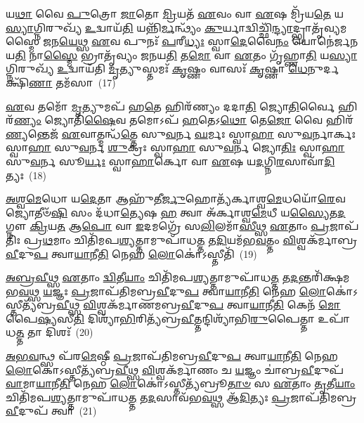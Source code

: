 {\anuvakamend[{\-\ul{𑌭𑌾}\-\-\ul{𑌗}\-𑌧𑍇\-\ul{𑌯}\-𑌞𑍍𑌜𑍁𑌹𑍍𑌵᳴𑌤𑌿 𑌪\-\ul{𑌰}\-𑌮𑌾 \ul{𑌰𑌾}\-𑌷𑍍𑌟𑍍𑌰𑌂 𑌦᳴𑌧𑌾𑌤𑌿 \ul{𑌸}\-𑌪𑍍𑌤 𑌚᳴}]}%

𑌯\-\ul{𑌥𑌾} 𑌵𑍈 \ul{𑌪𑍁}\-𑌤𑍍𑌰𑍋 \ul{𑌜𑌾}\-𑌤𑍋 \ul{𑌮𑍍𑌰𑌿}\-𑌯𑌤᳴ \ul{𑌏}\-𑌵𑌂 𑌵𑌾 \ul{𑌏}\-𑌷 𑌮𑍍𑌰𑌿᳴𑌯\-\ul{𑌤𑍇} 𑌯\-\ul{𑌸𑍍𑌯𑌾}\-𑌗𑍍𑌨𑌿𑌰𑍁𑌖𑍍𑌯᳴ \ul{𑌉}\-𑌦𑍍𑌵𑌾𑌯᳴\-\ul{𑌤𑌿} 𑌯𑌨𑍍𑌨𑌿᳴\-\ul{𑌰𑍍𑌮}\-𑌨𑍍𑌥𑍍𑌯𑌂᳴ \ul{𑌕𑍁}\-𑌰𑍍𑌯𑌾𑌦𑍍𑌵𑌿𑌚𑍍𑌛𑌿᳴\-\ul{𑌨𑍍𑌦𑍍𑌯𑌾}\-𑌦𑍍𑌭𑍍𑌰𑌾𑌤𑍃᳴𑌵𑍍𑌯𑌮𑌸𑍍𑌮𑍈 𑌜𑌨\-\ul{𑌯𑍇}\-𑌥𑍍𑌸 \ul{𑌏}\-𑌵 𑌪𑍁𑌨𑌃᳴ \ul{𑌪}\-𑌰𑍀\-\ul{𑌧𑍍𑌯𑌃} 𑌸𑍍𑌵𑌾\-\ul{𑌦𑍇}\-𑌵𑍈\-\ul{𑌨𑌂} 𑌯𑍋𑌨𑍇॑𑌰𑍍𑌜𑌨𑌯\-\ul{𑌤𑌿} 𑌨𑌾\-\ul{𑌸𑍍𑌮𑍈} 𑌭𑍍𑌰𑌾𑌤𑍃᳴𑌵𑍍𑌯𑌂 𑌜𑌨𑌯\-\ul{𑌤𑌿} 𑌤\-\ul{𑌮𑍋} 𑌵𑌾 \ul{𑌏}\-𑌤𑌂 𑌗𑍃᳴𑌹𑍍𑌣𑌾\-\ul{𑌤𑌿} 𑌯\-\ul{𑌸𑍍𑌯𑌾}\-𑌗𑍍𑌨𑌿𑌰𑍁𑌖𑍍𑌯᳴ \ul{𑌉}\-𑌦𑍍𑌵𑌾𑌯᳴𑌤𑌿 \ul{𑌮𑍃}\-𑌤𑍍𑌯𑍁𑌸𑍍𑌤𑌮𑌃᳴ \ul{𑌕𑍃}\-𑌷𑍍𑌣𑌂 𑌵𑌾𑌸𑌃᳴ \ul{𑌕𑍃}\-𑌷𑍍𑌣𑌾 \ul{𑌧𑍇}\-𑌨𑍁𑌰𑍍𑌦𑌕𑍍𑌷𑌿᳴\-\ul{𑌣𑌾} 𑌤𑌮᳴𑌸𑌾~(17)

\-\ul{𑌏}\-𑌵 𑌤𑌮𑍋᳴ \ul{𑌮𑍃}\-𑌤𑍍𑌯𑍁𑌮𑌪᳴ 𑌹\-\ul{𑌤𑍇} 𑌹𑌿𑌰᳴𑌣𑍍𑌯𑌂 𑌦𑌦𑌾\-\ul{𑌤𑌿} 𑌜𑍍𑌯𑍋\-\ul{𑌤𑌿}\-𑌰𑍍𑌵𑍈 𑌹𑌿𑌰᳴\-\ul{𑌣𑍍𑌯𑌂} 𑌜𑍍𑌯𑍋𑌤𑌿᳴\-\ul{𑌷𑍈}\-𑌵 𑌤𑌮𑍋\-𑌽𑌪᳴ \ul{𑌹}\-𑌤𑍇\-𑌽\-\ul{𑌥𑍋} 𑌤𑍇\-\ul{𑌜𑍋} 𑌵𑍈 𑌹𑌿𑌰᳴\-\ul{𑌣𑍍𑌯}\-𑌨𑍍𑌤𑍇𑌜᳴ \ul{𑌏}\-𑌵𑌾𑌤𑍍𑌮𑌨𑍍𑌧᳴\-\ul{𑌤𑍍𑌤𑍇} 𑌸𑍁\-\ul{𑌵}\-𑌰𑍍𑌨 \ul{𑌘}\-𑌰𑍍𑌮𑌃 𑌸𑍍𑌵𑌾\-\ul{𑌹𑌾} 𑌸𑍁\-\ul{𑌵}\-𑌰𑍍𑌨𑌾𑌰𑍍𑌕𑌃 𑌸𑍍𑌵𑌾\-\ul{𑌹𑌾} 𑌸𑍁\-\ul{𑌵}\-𑌰𑍍𑌨 \ul{𑌶𑍁}\-𑌕𑍍𑌰𑌃 𑌸𑍍𑌵𑌾\-\ul{𑌹𑌾} 𑌸𑍁\-\ul{𑌵}\-𑌰𑍍𑌨 𑌜𑍍𑌯𑍋\-\ul{𑌤𑌿𑌃} 𑌸𑍍𑌵𑌾\-\ul{𑌹𑌾} 𑌸𑍁\-\ul{𑌵}\-𑌰𑍍𑌨 𑌸𑍂\-\ul{𑌰𑍍𑌯𑌃} 𑌸𑍍𑌵𑌾\-\ul{𑌹𑌾}\-𑌰𑍍𑌕𑍋 𑌵𑌾 \ul{𑌏}\-𑌷 𑌯\-\ul{𑌦}\-𑌗𑍍𑌨𑌿\-\ul{𑌰}\-𑌸𑌾𑌵𑌾᳴\-\ul{𑌦𑌿}\-𑌤𑍍𑌯𑌃~(18)

\-\ul{𑌅}\-\-\ul{𑌶𑍍𑌵}\-\-\ul{𑌮𑍇}\-𑌧𑍋 𑌯\-\ul{𑌦𑍇}\-𑌤𑌾 𑌆𑌹𑍁᳴𑌤𑍀\-\ul{𑌰𑍍𑌜𑍁}\-𑌹𑍋𑌤𑍍𑌯᳴𑌰𑍍𑌕𑌾𑌶𑍍𑌵\-\ul{𑌮𑍇}\-𑌧𑌯𑍋᳴\-\ul{𑌰𑍇}\-𑌵 𑌜𑍍𑌯𑍋𑌤𑍀𑍞᳴\-\ul{𑌷𑌿} 𑌸𑌂 𑌦᳴𑌧𑌾\-\ul{𑌤𑍍𑌯𑍇}\-𑌷 \ul{𑌹} 𑌤𑍍𑌵𑌾 𑌅᳴𑌰𑍍𑌕𑌾𑌶𑍍𑌵\-\ul{𑌮𑍇}\-𑌧𑍀 𑌯\-\ul{𑌸𑍍𑌯𑍈}\-𑌤\-\ul{𑌦}\-𑌗𑍍𑌨𑍗 \ul{𑌕𑍍𑌰𑌿}\-𑌯\-\ul{𑌤} 𑌆\-\ul{𑌪𑍋} 𑌵𑌾 \ul{𑌇}\-𑌦𑌮𑌗𑍍𑌰𑍇᳴ 𑌸\-\ul{𑌲𑌿}\-𑌲𑌮𑌾᳴\-\ul{𑌸𑍀}\-𑌥𑍍𑌸 \ul{𑌏}\-𑌤𑌾𑌂 \ul{𑌪𑍍𑌰}\-𑌜𑌾𑌪᳴𑌤𑌿𑌃 𑌪𑍍𑌰\-\ul{𑌥}\-𑌮𑌾𑌂 𑌚𑌿𑌤𑌿᳴𑌮𑌪\-\ul{𑌶𑍍𑌯}\-𑌤𑍍𑌤𑌾𑌮𑍁𑌪𑌾᳴𑌧\-\ul{𑌤𑍍𑌤} 𑌤\-\ul{𑌦𑌿}\-𑌯𑌮᳴𑌭\-\ul{𑌵}\-𑌤𑍍𑌤𑌂 \ul{𑌵𑌿}\-𑌶𑍍𑌵𑌕᳴𑌰𑍍𑌮𑌾𑌬𑍍𑌰\-\ul{𑌵𑍀}\-𑌦𑍁\-\ul{𑌪} 𑌤𑍍𑌵𑌾\-\ul{𑌯𑌾}\-𑌨𑍀\-\ul{𑌤𑌿} 𑌨𑍇𑌹 \ul{𑌲𑍋}\-𑌕𑍋॑\-𑌽𑌸𑍍𑌤𑍀𑌤𑌿᳴~(19)

\-\ul{𑌅}\-\-\ul{𑌬𑍍𑌰}\-\-\ul{𑌵𑍀}\-𑌥𑍍𑌸 \ul{𑌏}\-𑌤𑌾𑌂 \ul{𑌦𑍍𑌵𑌿}\-𑌤𑍀\-\ul{𑌯𑌾𑌂} 𑌚𑌿𑌤𑌿᳴𑌮𑌪\-\ul{𑌶𑍍𑌯}\-𑌤𑍍𑌤𑌾𑌮𑍁𑌪𑌾᳴𑌧\-\ul{𑌤𑍍𑌤} 𑌤\-\ul{𑌦}\-𑌨𑍍𑌤𑌰𑌿᳴𑌕𑍍𑌷𑌮𑌭\-\ul{𑌵}\-𑌥𑍍𑌸 \ul{𑌯}\-𑌜𑍍𑌞𑌃 \ul{𑌪𑍍𑌰}\-𑌜𑌾𑌪᳴𑌤𑌿𑌮𑌬𑍍𑌰\-\ul{𑌵𑍀}\-𑌦𑍁\-\ul{𑌪} 𑌤𑍍𑌵𑌾\-\ul{𑌯𑌾}\-𑌨𑍀\-\ul{𑌤𑌿} 𑌨𑍇𑌹 \ul{𑌲𑍋}\-𑌕𑍋॑\-𑌽𑌸𑍍𑌤𑍀𑌤𑍍𑌯᳴𑌬𑍍𑌰\-\ul{𑌵𑍀}\-𑌥𑍍𑌸 \ul{𑌵𑌿}\-𑌶𑍍𑌵𑌕᳴𑌰𑍍𑌮𑌾𑌣𑌮𑌬𑍍𑌰\-\ul{𑌵𑍀}\-𑌦𑍁\-\ul{𑌪} 𑌤𑍍𑌵𑌾\-\ul{𑌯𑌾}\-𑌨𑍀\-\ul{𑌤𑌿} 𑌕𑍇𑌨᳴ \ul{𑌮𑍋}\-𑌪𑍈\-\ul{𑌷𑍍𑌯}\-𑌸𑍀\-\ul{𑌤𑌿} 𑌦𑌿𑌶𑍍𑌯𑌾᳴\-\ul{𑌭𑌿}\-𑌰𑌿𑌤𑍍𑌯᳴𑌬𑍍𑌰\-\ul{𑌵𑍀}\-𑌤𑍍𑌤𑌨𑍍𑌦𑌿𑌶𑍍𑌯𑌾᳴𑌭𑌿\-\ul{𑌰𑍁}\-𑌪𑍈𑌤𑍍𑌤𑌾 𑌉𑌪𑌾᳴𑌧\-\ul{𑌤𑍍𑌤} 𑌤𑌾 𑌦𑌿𑌶𑌃᳴~(20)

\-\ul{𑌅}\-\-\ul{𑌭}\-\-\ul{𑌵}\-𑌨𑍍𑌥𑍍𑌸 𑌪᳴𑌰\-\ul{𑌮𑍇}\-𑌷𑍍𑌠𑍀 \ul{𑌪𑍍𑌰}\-𑌜𑌾𑌪᳴𑌤𑌿𑌮𑌬𑍍𑌰\-\ul{𑌵𑍀}\-𑌦𑍁\-\ul{𑌪} 𑌤𑍍𑌵𑌾\-\ul{𑌯𑌾}\-𑌨𑍀\-\ul{𑌤𑌿} 𑌨𑍇𑌹 \ul{𑌲𑍋}\-𑌕𑍋॑\-𑌽𑌸𑍍𑌤𑍀𑌤𑍍𑌯᳴𑌬𑍍𑌰\-\ul{𑌵𑍀}\-𑌥𑍍𑌸 \ul{𑌵𑌿}\-𑌶𑍍𑌵𑌕᳴𑌰𑍍𑌮𑌾𑌣𑌂 𑌚 \ul{𑌯}\-𑌜𑍍𑌞𑌂 𑌚𑌾॑𑌬𑍍𑌰\-\ul{𑌵𑍀}\-𑌦𑍁𑌪᳴ \ul{𑌵𑌾}\-𑌮𑌾\-\ul{𑌯𑌾}\-𑌨𑍀\-\ul{𑌤𑌿} 𑌨𑍇𑌹 \ul{𑌲𑍋}\-𑌕𑍋॑\-𑌽𑌸𑍍𑌤𑍀𑌤𑍍𑌯᳴𑌬𑍍𑌰𑍂\-\ul{𑌤𑌾}\-\-\ul{𑍞} 𑌸 \ul{𑌏}\-𑌤𑌾𑌂 \ul{𑌤𑍃}\-𑌤𑍀\-\ul{𑌯𑌾𑌂} 𑌚𑌿𑌤𑌿᳴𑌮𑌪\-\ul{𑌶𑍍𑌯}\-𑌤𑍍𑌤𑌾𑌮𑍁𑌪𑌾᳴𑌧\-\ul{𑌤𑍍𑌤} 𑌤\-\ul{𑌦}\-𑌸𑌾𑌵᳴𑌭\-\ul{𑌵}\-𑌥𑍍𑌸 𑌆᳴\-\ul{𑌦𑌿}\-𑌤𑍍𑌯𑌃 \ul{𑌪𑍍𑌰}\-𑌜𑌾𑌪᳴𑌤𑌿𑌮𑌬𑍍𑌰\-\ul{𑌵𑍀}\-𑌦𑍁𑌪᳴ 𑌤𑍍𑌵𑌾~(21)

